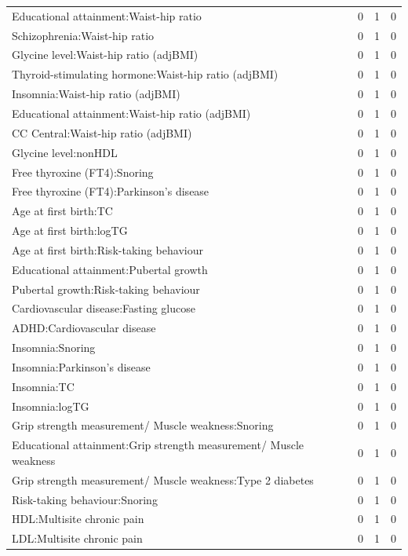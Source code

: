 \begin{table}[ht]
\begin{tabular}{lrrr}
  Educational attainment:Waist-hip ratio &   0 &   1 &   0 \\ 
  Schizophrenia:Waist-hip ratio &   0 &   1 &   0 \\ 
  Glycine level:Waist-hip ratio (adjBMI) &   0 &   1 &   0 \\ 
  Thyroid-stimulating hormone:Waist-hip ratio (adjBMI) &   0 &   1 &   0 \\ 
  Insomnia:Waist-hip ratio (adjBMI) &   0 &   1 &   0 \\ 
  Educational attainment:Waist-hip ratio (adjBMI) &   0 &   1 &   0 \\ 
  CC Central:Waist-hip ratio (adjBMI) &   0 &   1 &   0 \\ 
  Glycine level:nonHDL &   0 &   1 &   0 \\ 
  Free thyroxine (FT4):Snoring &   0 &   1 &   0 \\ 
  Free thyroxine (FT4):Parkinson's disease &   0 &   1 &   0 \\ 
  Age at first birth:TC &   0 &   1 &   0 \\ 
  Age at first birth:logTG &   0 &   1 &   0 \\ 
  Age at first birth:Risk-taking behaviour &   0 &   1 &   0 \\ 
  Educational attainment:Pubertal growth &   0 &   1 &   0 \\ 
  Pubertal growth:Risk-taking behaviour &   0 &   1 &   0 \\ 
  Cardiovascular disease:Fasting glucose &   0 &   1 &   0 \\ 
  ADHD:Cardiovascular disease &   0 &   1 &   0 \\ 
  Insomnia:Snoring &   0 &   1 &   0 \\ 
  Insomnia:Parkinson's disease &   0 &   1 &   0 \\ 
  Insomnia:TC &   0 &   1 &   0 \\ 
  Insomnia:logTG &   0 &   1 &   0 \\ 
  Grip strength measurement/ Muscle weakness:Snoring &   0 &   1 &   0 \\ 
  Educational attainment:Grip strength measurement/ Muscle weakness &   0 &   1 &   0 \\ 
  Grip strength measurement/ Muscle weakness:Type 2 diabetes &   0 &   1 &   0 \\ 
  Risk-taking behaviour:Snoring &   0 &   1 &   0 \\ 
  HDL:Multisite chronic pain &   0 &   1 &   0 \\ 
  LDL:Multisite chronic pain &   0 &   1 &   0 \\ 

\end{tabular}
\end{table}
